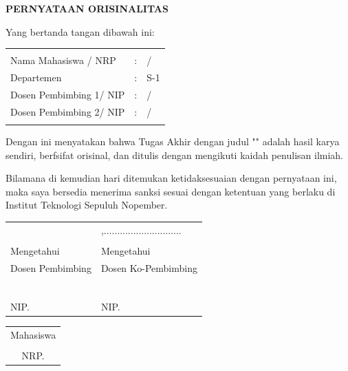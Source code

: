 \begin{center}
  \large
  \textbf{PERNYATAAN ORISINALITAS}
\end{center}

\thispagestyle{empty}

\vspace{2ex}


\noindent Yang bertanda tangan dibawah ini:

\noindent\begin{tabularx}{\textwidth}{l l X}
                         &   &                            \\
  Nama Mahasiswa / NRP   & : & \name{} / \nrp{}           \\
  Departemen             & : & S-1 \department{}              \\
  Dosen Pembimbing 1/ NIP & : & \advisor{} / \advisornip{} \\
  Dosen Pembimbing 2/ NIP & : & \coadvisor{} / \coadvisornip{} \\
                          &   &                            \\
\end{tabularx}

Dengan ini menyatakan bahwa Tugas Akhir dengan judul "\tatitle{}" adalah hasil karya sendiri, berfsifat orisinal, dan ditulis dengan mengikuti kaidah penulisan ilmiah.

Bilamana di kemudian hari ditemukan ketidaksesuaian dengan pernyataan ini, maka saya bersedia menerima sanksi sesuai dengan ketentuan yang berlaku di Institut Teknologi Sepuluh Nopember.

\vspace{8ex}

\noindent\begin{tabularx}{\textwidth}{X l}
                     & \place{},.............................  \\
                     &                                   \\
  Mengetahui         &   Mengetahui                         \\
  Dosen Pembimbing    & Dosen Ko-Pembimbing                 \\
                     &                                   \\
                     &                                   \\
                     &                                   \\
                     &                                   \\
                     &                                   \\
  \advisor{}         & \coadvisor{}                           \\
  NIP. \advisornip{} & NIP. \coadvisornip{}                       \\
\end{tabularx}

\noindent
\begin{center}
\begin{tabular}{c}
Mahasiswa \\[5em]
\name{} \\
NRP. \nrp{}
\end{tabular}
\end{center}